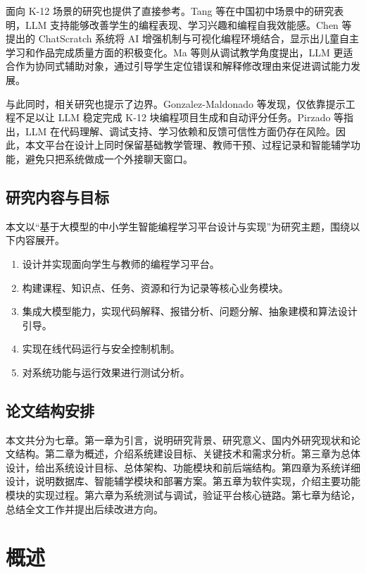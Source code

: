 面向 K-12 场景的研究也提供了直接参考。Tang 等在中国初中场景中的研究表明，LLM 支持能够改善学生的编程表现、学习兴趣和编程自我效能感\cite{tang2025middleschool}。Chen 等提出的 ChatScratch 系统将 AI 增强机制与可视化编程环境结合，显示出儿童自主学习和作品完成质量方面的积极变化\cite{chen2024chatscratch}。Ma 等则从调试教学角度提出，LLM 更适合作为协同式辅助对象，通过引导学生定位错误和解释修改理由来促进调试能力发展\cite{ma2024teachableagent}。

与此同时，相关研究也提示了边界。Gonzalez-Maldonado 等发现，仅依靠提示工程不足以让 LLM 稳定完成 K-12 块编程项目生成和自动评分任务\cite{gonzalez2025k12gpt}。Pirzado 等指出，LLM 在代码理解、调试支持、学习依赖和反馈可信性方面仍存在风险\cite{pirzado2024pitfalls}。因此，本文平台在设计上同时保留基础教学管理、教师干预、过程记录和智能辅学功能，避免只把系统做成一个外接聊天窗口。

\section{研究内容与目标}
本文以“基于大模型的中小学生智能编程学习平台设计与实现”为研究主题，围绕以下内容展开。
\begin{enumerate}
  \item 设计并实现面向学生与教师的编程学习平台。
  \item 构建课程、知识点、任务、资源和行为记录等核心业务模块。
  \item 集成大模型能力，实现代码解释、报错分析、问题分解、抽象建模和算法设计引导。
  \item 实现在线代码运行与安全控制机制。
  \item 对系统功能与运行效果进行测试分析。
\end{enumerate}

\section{论文结构安排}
本文共分为七章。第一章为引言，说明研究背景、研究意义、国内外研究现状和论文结构。第二章为概述，介绍系统建设目标、关键技术和需求分析。第三章为总体设计，给出系统设计目标、总体架构、功能模块和前后端结构。第四章为系统详细设计，说明数据库、智能辅学模块和部署方案。第五章为软件实现，介绍主要功能模块的实现过程。第六章为系统测试与调试，验证平台核心链路。第七章为结论，总结全文工作并提出后续改进方向。


\chapter{概述}

